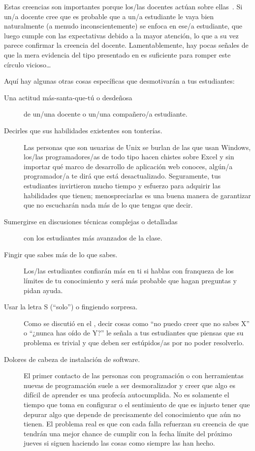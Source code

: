 Estas creencias son importantes porque los/las docentes actúan sobre ellas~\cite{Brop1983}.
Si un/a docente cree que es probable que a un/a estudiante le vaya bien
naturalmente (a menudo inconscientemente) se enfoca en ese/a estudiante,
que luego cumple con las expectativas debido a la mayor atención,
lo que a su vez parece confirmar la creencia del docente.
Lamentablemente,
hay pocas señales de que la mera evidencia del tipo presentado en \cite{Pati2016}
es suficiente para romper este círculo vicioso{\ldots}

Aquí hay algunas otras cosas específicas que desmotivarán a tus estudiantes:

\begin{description}

\item[Una actitud más-santa-que-tú o desdeñosa]
  de un/una docente o un/una compañero/a estudiante.

\item[Decirles que sus habilidades existentes son tonterías.]
  Las personas que son usuarias de Unix se burlan de las que usan Windows,
  los/las programadores/as de todo tipo hacen chistes sobre Excel
  y sin importar qué marco de desarrollo de aplicación web conoces,
  algún/a programador/a te dirá que está desactualizado.
  Seguramente, tus estudiantes invirtieron mucho tiempo y esfuerzo para adquirir las habilidades que tienen;
  menospreciarlas es una buena manera de garantizar que
  no escucharán nada más de lo que tengas que decir.

\item[Sumergirse en discusiones técnicas complejas o detalladas]
  con los estudiantes más avanzados de la clase.

\item[Fingir que sabes más de lo que sabes.]
  Los/las estudiantes confiarán más en ti si hablas con franqueza de los límites de tu conocimiento
  y será más probable que hagan preguntas y pidan ayuda.

\item[Usar la letra S (``solo'') o fingiendo sorpresa.]
  Como se discutió en el ,
  decir cosas como ``no puedo creer que no sabes X'' o ``¿nunca has oído de Y?''
  le señala a tus estudiantes que
  piensas que su problema es trivial
  y que deben ser estúpidos/as por no poder resolverlo.

\item[Dolores de cabeza de instalación de software.]
  El primer contacto de las personas con programación o con herramientas nuevas de programación suele a ser desmoralizador
  y creer que algo es difícil de aprender es una profecía autocumplida.
  No es solamente el tiempo que toma en configurar
  o el sentimiento de que es injusto tener que depurar algo que depende de
  precisamente del conocimiento que aún no tienen.
    El problema real es que con cada falla refuerzan su creencia de que
  tendrán una mejor chance de cumplir con la fecha límite del próximo jueves
  si siguen haciendo las cosas como siempre las han hecho.

\end{description}

